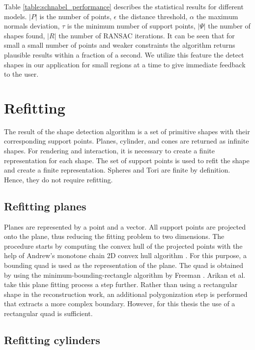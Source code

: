 Table \ref{table:schnabel_performance} describes the statistical results for different models. $|P|$ is the number of points, $\epsilon$ the distance threshold, $\alpha$ the maximum normals deviation, $\tau$ is the minimum number of support points, $|\Psi|$ the number of shapes found, $|R|$ the number of RANSAC iterations. It can be seen that for small a small number of points and weaker constraints the algorithm returns plausible results within a fraction of a second. We utilize this feature the detect shapes in our application for small regions at a time to give immediate feedback to the user. 



\section{Refitting}
\label{sec:Refitting}

The result of the shape detection algorithm is a set of primitive shapes with their corresponding support points. Planes, cylinder, and cones are returned as infinite shapes. For rendering and interaction, it is necessary to create a finite representation for each shape. The set of support points is used to refit the shape and create a finite representation. Spheres and Tori are finite by definition. Hence, they do not require refitting. 


\subsection{Refitting planes}

Planes are represented by a point and a vector. All support points are projected onto the plane, thus reducing the fitting problem to two dimensions. The procedure starts by computing the convex hull of the projected points with the help of Andrew's monotone chain 2D convex hull algorithm \cite{andrew1979another}. 
For this purpose, a bounding quad is used as the representation of the plane. The quad is obtained by using the minimum-bounding-rectangle algorithm by Freeman \cite{freeman1975determining}. Arikan et al. \cite{arikan-2013-osn} take this plane fitting process a step further. Rather than using a rectangular shape in the reconstruction work, an additional polygonization step is performed that extracts a more complex boundary. However, for this thesis the use of a rectangular quad is sufficient.  


\subsection{Refitting cylinders}

